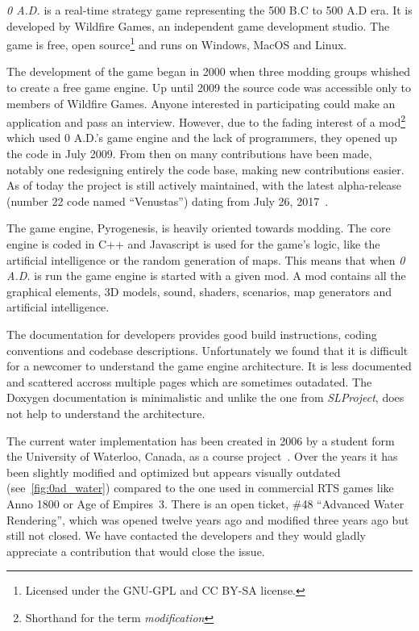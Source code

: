 \textit{0 A.D.} is a real-time strategy game representing the 500 B.C to 500 A.D
era. It is developed by Wildfire Games, an independent game development studio.
The game is free, open source\footnote{Licensed under the GNU-GPL and CC BY-SA
license.} and runs on Windows, MacOS and Linux.

The development of the game began in 2000 when three modding groups whished to
create a free game engine. Up until 2009 the source code was accessible only to
members of Wildfire Games. Anyone interested in participating could make an
application and pass an interview. However, due to the fading interest of a
mod\footnote{Shorthand for the term \textit{modification}} which used 0 A.D.'s
game engine and the lack of programmers, they opened up the code in July 2009.
From then on many contributions have been made, notably one redesigning entirely
the code base, making new contributions easier. As of today the project is still
actively maintained, with the latest alpha-release (number 22 code named
``Venustas'') dating from July 26,
2017~\autocite{wildfire0adproject,wildfire0adstory}.

The game engine, Pyrogenesis, is heavily oriented towards modding. The core
engine is coded in C++ and Javascript is used for the game's logic, like the
artificial intelligence or the random generation of maps. This means that when
\textit{0 A.D.} is run the game engine is started with a given mod. A mod
contains all the graphical elements, 3D models, sound, shaders, scenarios, map
generators and artificial intelligence.

The documentation for developers provides good build instructions, coding
conventions and codebase descriptions. Unfortunately we found that it is
difficult for a newcomer to understand the game engine architecture. It is less
documented and scattered accross multiple pages which are sometimes outadated.
The Doxygen documentation is minimalistic and unlike the one from
\textit{SLProject}, does not help to understand the architecture.

The current water implementation has been created in 2006 by a student form the
University of Waterloo, Canada, as a course project~\autocite{zaharia2006cs}.
Over the years it has been slightly modified and optimized but appears visually
outdated (see~\autoref{fig:0ad_water}) compared to the one used in
commercial RTS games like Anno 1800 or Age of Empires~3. There is an open
ticket, \#48 ``Advanced Water Rendering'', which was opened twelve years ago and
modified three years ago but still not closed.  We have contacted the developers
and they would gladly appreciate a contribution that would close the issue.

